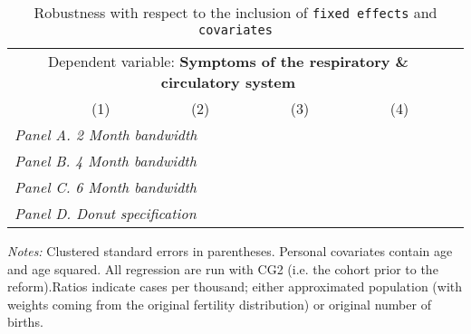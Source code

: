  \begin{table}[H] \begin{threeparttable} \centering \caption{Robustness with respect to the inclusion of \texttt{fixed effects} and \texttt{covariates}} {\def\sym#1{\ifmmode^{#1}\else\(^{#1}\)\fi} \begin{tabular}{l*{5}{c}} \toprule \multicolumn{5}{c}{Dependent variable: \textbf{Symptoms of the respiratory \& circulatory system}} \\ \cmidrule(lr){2-5}
            &\multicolumn{1}{c}{(1)}&\multicolumn{1}{c}{(2)}&\multicolumn{1}{c}{(3)}&\multicolumn{1}{c}{(4)}\\
\midrule
 \multicolumn{5}{l}{\emph{Panel A. 2 Month bandwidth}} \\    \midrule\multicolumn{5}{l}{\emph{Panel B. 4 Month bandwidth}} \\    \midrule\multicolumn{5}{l}{\emph{Panel C. 6 Month bandwidth}} \\    \midrule\multicolumn{5}{l}{\emph{Panel D. Donut specification}} \\    \midrule  
\bottomrule \end{tabular} } \begin{tablenotes} \item \scriptsize \emph{Notes:} Clustered standard errors in parentheses. Personal covariates contain age and age squared. All regression are run with CG2 (i.e. the cohort prior to the reform).Ratios indicate cases per thousand; either approximated population (with weights coming from the original fertility distribution) or original number of births. \end{tablenotes} \end{threeparttable} \end{table} 
